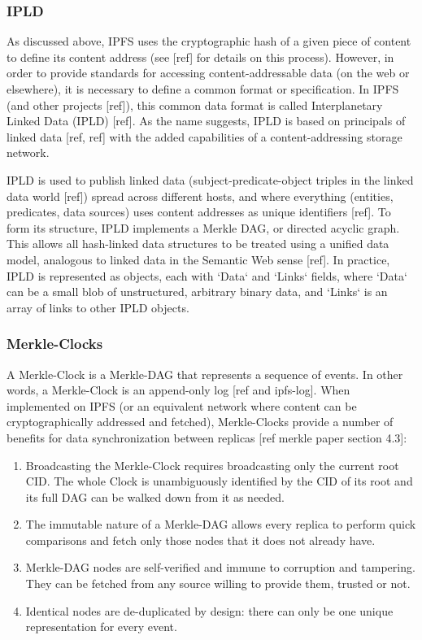 \documentclass{comjnl}
\begin{document}
\subsubsection{IPLD}

As discussed above, IPFS uses the cryptographic hash of a given piece of content to define its content address (see [ref] for details on this process). However, in order to provide standards for accessing content-addressable data (on the web or elsewhere), it is necessary to define a common format or specification. In IPFS (and other projects [ref]), this common data format is called Interplanetary Linked Data (IPLD) [ref]. As the name suggests, IPLD is based on principals of linked data [ref, ref] with the added capabilities of a content-addressing storage network. 

IPLD is used to publish linked data (subject-predicate-object triples in the linked data world [ref]) spread across different hosts, and where everything (entities, predicates, data sources) uses content addresses as unique identifiers [ref]. To form its structure, IPLD implements a Merkle DAG, or directed acyclic graph. This allows all hash-linked data structures to be treated using a unified data model, analogous to linked data in the Semantic Web sense [ref]. In practice, IPLD is represented as objects, each with `Data` and `Links` fields, where `Data` can be a small blob of unstructured, arbitrary binary data, and `Links` is an array of links to other IPLD objects. 

\subsubsection{Merkle-Clocks} \label{sec:merkleclocks}

A Merkle-Clock is a Merkle-DAG that represents a sequence of events. In other words, a Merkle-Clock is an append-only log [ref and ipfs-log]. When implemented on IPFS (or an equivalent network where content can be cryptographically addressed and fetched), Merkle-Clocks provide a number of benefits for data synchronization between replicas [ref merkle paper section 4.3]:

\begin{enumerate}
\item \label{Perf1}Broadcasting the Merkle-Clock requires broadcasting only the current root CID. The whole Clock is unambiguously identified by the CID of its root and its full DAG can be walked down from it as needed.
\item \label{Perf2}The immutable nature of a Merkle-DAG allows every replica to perform quick comparisons and fetch only those nodes that it does not already have.
\item \label{Perf3} Merkle-DAG nodes are self-verified and immune to corruption and tampering. They can be fetched from any source willing to provide them, trusted or not.
\item \label{Perf4} Identical nodes are de-duplicated by design: there can only be one unique representation for every event.
\end{enumerate}
\end{document}
